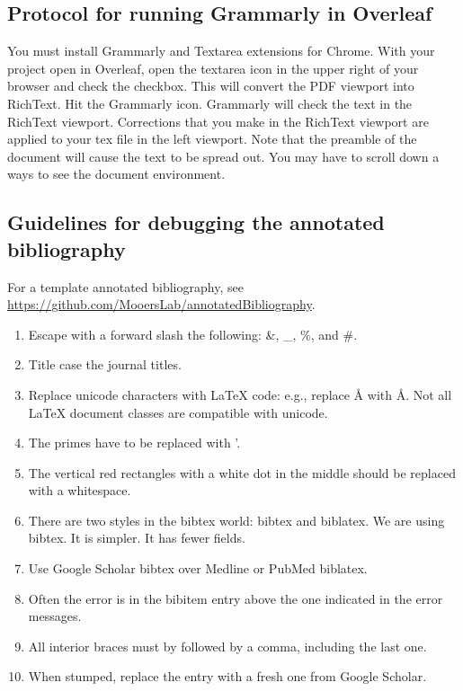\documentclass[11pt,letterpaper]{article}
\begin{document}
\subsection{Protocol for running Grammarly in Overleaf}
\label{sec:org1ff3169}


You must install Grammarly and Textarea extensions for Chrome. With your
project open in Overleaf, open the textarea icon in the upper right of
your browser and check the checkbox. This will convert the PDF viewport
into RichText. Hit the Grammarly icon. Grammarly will check the text in
the RichText viewport. Corrections that you make in the RichText
viewport are applied to your tex file in the left viewport. Note that
the preamble of the document will cause the text to be spread out. You
may have to scroll down a ways to see the document environment.



\subsection{Guidelines for debugging the annotated bibliography}
\label{sec:org0152b62}



For a template annotated bibliography, see
\url{https://github.com/MooersLab/annotatedBibliography}.

\begin{enumerate}
\item Escape with a forward slash the following: \&, \_, \%, and \#.
\item Title case the journal titles.
\item Replace unicode characters with \LaTeX{} code: e.g., replace Å with Å.
Not all \LaTeX{} document classes are compatible with unicode.
\item The primes have to be replaced with '.
\item The vertical red rectangles with a white dot in the middle should be
replaced with a whitespace.
\item There are two styles in the bibtex world: bibtex and biblatex. We are
using bibtex. It is simpler. It has fewer fields.
\item Use Google Scholar bibtex over Medline or PubMed biblatex.
\item Often the error is in the bibitem entry above the one indicated in
the error messages.
\item All interior braces must by followed by a comma, including the last
one.
\item When stumped, replace the entry with a fresh one from Google
Scholar.
\end{enumerate}
\end{document}
